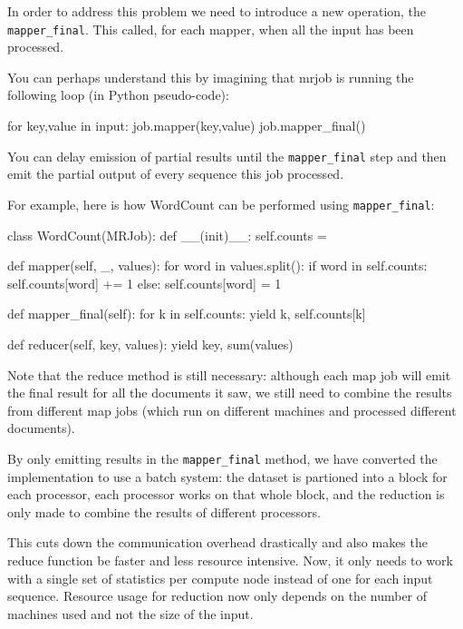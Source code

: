 In order to address this problem we need to introduce a new operation, the
\verb+mapper_final+. This called, for each mapper, when all the input has been
processed.

You can perhaps understand this by imagining that mrjob is running the
following loop (in Python pseudo-code):

\begin{python}
for key,value in input:
    job.mapper(key,value)
job.mapper_final()
\end{python}

You can delay emission of partial results until the \verb+mapper_final+ step and
then emit the partial output of every sequence this job processed.

For example, here is how WordCount can be performed using \verb+mapper_final+:

\begin{python}
class WordCount(MRJob):
    def __(init)__:
        self.counts = {}
    
    def mapper(self, _, values):
        for word in values.split():
            if word in self.counts:
                self.counts[word] += 1
            else:
                self.counts[word] = 1

    def mapper_final(self):
        for k in self.counts:
            yield k, self.counts[k]

    def reducer(self, key, values):
        yield key, sum(values)
\end{python}

Note that the reduce method is still necessary: although each map job will emit
the final result for all the documents it saw, we still need to combine the
results from different map jobs (which run on different machines and processed
different documents).

By only emitting results in the \verb+mapper_final+ method, we have converted the
implementation to use a batch system: the dataset is partioned into a block for
each processor, each processor works on that whole block, and the reduction is
only made to combine the results of different processors.

This cuts down the communication overhead drastically and also makes the reduce
function be faster and less resource intensive. Now, it only needs to work with
a single set of statistics per compute node instead of one for each input
sequence. Resource usage for reduction now only depends on the number of
machines used and not the size of the input.


